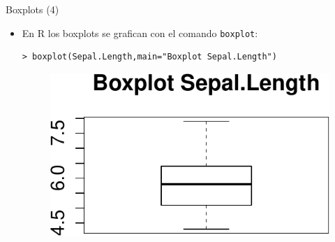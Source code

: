 \documentclass[handout]{beamer}
\begin{document}
\begin{frame}[fragile]{Boxplots (4)}
\scriptsize{
\begin{itemize}
 \item En R los boxplots se grafican con el comando \verb+boxplot+:
 \begin{verbatim}
> boxplot(Sepal.Length,main="Boxplot Sepal.Length")
 \end{verbatim}

 \begin{figure}[h!]
	\centering
	\includegraphics[scale=0.7]{imagenes/boxplotsimple.pdf}		
\end{figure} 
 
 
\end{itemize}



}
\end{frame}
\end{document}
